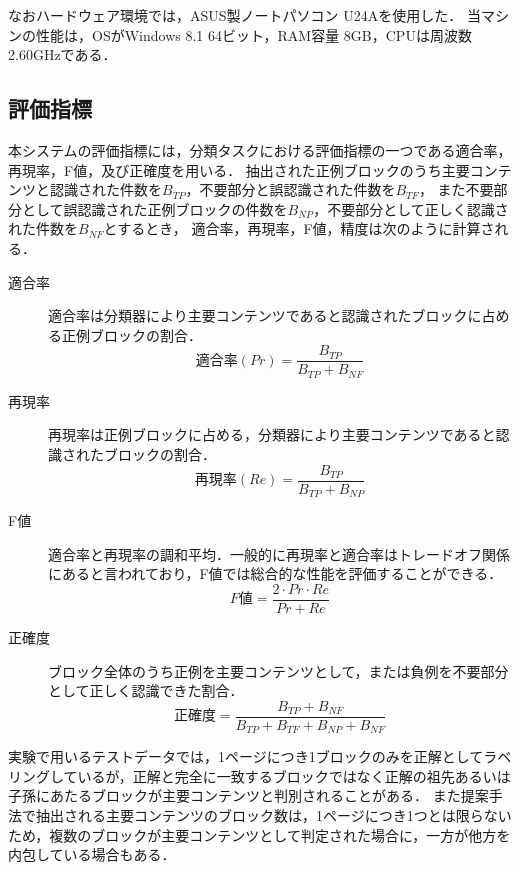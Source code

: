 \documentclass[a4paper,10pt,twocolumn]{jsarticle}
\begin{document}
なおハードウェア環境では，ASUS製ノートパソコン U24Aを使用した．
当マシンの性能は，OSがWindows 8.1 64ビット，RAM容量 8GB，CPUは周波数2.60GHzである．

\subsection{評価指標}

本システムの評価指標には，分類タスクにおける評価指標の一つである適合率，再現率，F値，及び正確度を用いる．
抽出された正例ブロックのうち主要コンテンツと認識された件数を$B_{TP}$，不要部分と誤認識された件数を$B_{TF}$，
また不要部分として誤認識された正例ブロックの件数を$B_{NP}$，不要部分として正しく認識された件数を$B_{NF}$とするとき，
適合率，再現率，F値，精度は次のように計算される．

\begin{description}
  \item[適合率] 適合率は分類器により主要コンテンツであると認識されたブロックに占める正例ブロックの割合．
  \begin{equation}
    適合率(Pr) = \frac{B_{TP}}{B_{TP} + B_{NF}}
  \end{equation}

  \item[再現率] 再現率は正例ブロックに占める，分類器により主要コンテンツであると認識されたブロックの割合．
  \begin{equation}
    再現率(Re) = \frac{B_{TP}}{B_{TP} + B_{NP}}
  \end{equation}

  \item[F値] 適合率と再現率の調和平均．一般的に再現率と適合率はトレードオフ関係にあると言われており，F値では総合的な性能を評価することができる．
  \begin{equation}
    F値 = \frac{2\cdot Pr \cdot Re}{Pr + Re}
  \end{equation}

  \item[正確度] ブロック全体のうち正例を主要コンテンツとして，または負例を不要部分として正しく認識できた割合．
  \begin{equation}
    正確度 = \frac{B_{TP} + B_{NF}}{B_{TP} + B_{TF} + B_{NP} + B_{NF}}
  \end{equation}
\end{description}

実験で用いるテストデータでは，1ページにつき1ブロックのみを正解としてラベリングしているが，正解と完全に一致するブロックではなく正解の祖先あるいは子孫にあたるブロックが主要コンテンツと判別されることがある．
また提案手法で抽出される主要コンテンツのブロック数は，1ページにつき1つとは限らないため，複数のブロックが主要コンテンツとして判定された場合に，一方が他方を内包している場合もある．
\end{document}
